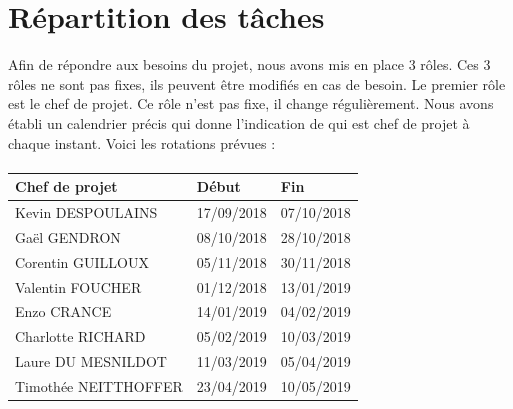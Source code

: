 \section{Répartition des tâches}

Afin de répondre aux besoins du projet, nous avons mis en place 3 rôles. Ces 3 rôles ne sont pas fixes,
ils peuvent être modifiés en cas de besoin. Le premier rôle est le chef de projet. Ce rôle n’est pas fixe,
il change régulièrement. Nous avons établi un calendrier précis qui donne l’indication de qui
est chef de projet à chaque instant. Voici les rotations prévues :

\paragraph{}
\begin{center}
\begin{tabular}{ | l | l | l | }
\hline
{\textbf{Chef de projet}}   &   {\textbf{Début}}    &   {\textbf{Fin}}  \\ \hline
{Kevin DESPOULAINS}         &   {17/09/2018}        &	{07/10/2018}    \\ \hline
{Gaël GENDRON}              &   {08/10/2018}	    &	{28/10/2018}    \\ \hline
{Corentin GUILLOUX}         &   {05/11/2018}	    &	{30/11/2018}    \\ \hline
{Valentin FOUCHER}          &   {01/12/2018}	    &	{13/01/2019}    \\ \hline
{Enzo CRANCE}               &   {14/01/2019}	    &	{04/02/2019}    \\ \hline
{Charlotte RICHARD}         &   {05/02/2019}	    &	{10/03/2019}    \\ \hline
{Laure DU MESNILDOT}        &   {11/03/2019}	    &	{05/04/2019}    \\ \hline
{Timothée NEITTHOFFER}      &	{23/04/2019}	    &	{10/05/2019}    \\ \hline
\end{tabular}
\end{center}
    
